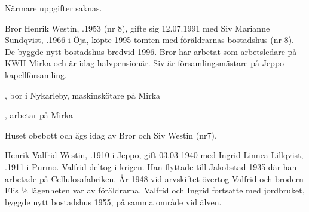 Närmare uppgifter saknas.\jhvspace{}






Bror Henrik Westin, .1953 (nr 8), gifte sig 12.07.1991 med Siv Marianne Sundqvist, .1966 i Öja, köpte 1995 tomten med föräldrarnas bostadshus (nr 8). De byggde nytt bostadshus bredvid 1996. Bror har arbetat som arbetsledare på KWH-Mirka och är idag halvpensionär. Siv är församlingsmästare på Jeppo kapellförsamling.
\begin{jhchildren}
  \item {}, bor i Nykarleby, maskinskötare på Mirka
  \item {}, arbetar på Mirka
\end{jhchildren}




Huset obebott och ägs idag av Bror och Siv Westin (nr7).\jhvspace{}



Henrik Valfrid Westin, .1910 i Jeppo, gift 03.03 1940 med Ingrid Linnea Lillqvist, .1911 i Purmo. Valfrid deltog i krigen. Han flyttade till Jakobstad 1935 där han arbetade på Cellulosafabriken. År 1948 vid arvskiftet övertog Valfrid och brodern Elis ½ lägenheten var av föräldrarna. Valfrid och Ingrid fortsatte med jordbruket, byggde nytt bostadshus 1955, på samma område vid älven.

